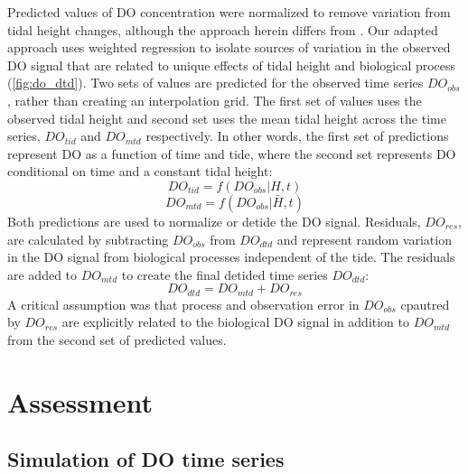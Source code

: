 \documentclass[letterpaper,12pt,oneside]{article}\usepackage[]{graphicx}\usepackage[]{color}
\begin{document}
Predicted values of \ac{DO} concentration were normalized to remove variation from tidal height changes, although the approach herein differs from \citet{Hirsch10}.  Our adapted approach uses weighted regression to isolate sources of variation in the observed \ac{DO} signal that are related to unique effects of tidal height and biological process (\cref{fig:do_dtd}).  Two sets of values are predicted for the observed time series $DO_{obs}$, rather than creating an interpolation grid.  The first set of values uses the observed tidal height and second set uses the mean tidal height across the time series, $DO_{tid}$ and $DO_{mtd}$ respectively.  In other words, the first set of predictions represent \ac{DO} as a function of time and tide, where the second set represents \ac{DO} conditional on time and a constant tidal height:
\begin{equation} \label{do_tid}
DO_{tid} = f(DO_{obs}|H, t)
\end{equation}
\begin{equation} \label{do_mtd}
DO_{mtd} = f(DO_{obs}|\bar{H}, t)
\end{equation}
Both predictions are used to normalize or detide the \ac{DO} signal.  Residuals, $DO_{res}$, are calculated by subtracting $DO_{obs}$ from $DO_{dtd}$ and represent random variation in the \ac{DO} signal from biological processes independent of the tide. The residuals are added to $DO_{mtd}$ to create the final detided time series $DO_{dtd}$:
\begin{equation} \label{do_dtd}
DO_{dtd} = DO_{mtd} + DO_{res}
\end{equation}
A critical assumption was that process and observation error in $DO_{obs}$ cpautred by $DO_{res}$ are explicitly related to the biological \ac{DO} signal in addition to $DO_{mtd}$ from the second set of predicted values. 

\section{Assessment}

\subsection{Simulation of \ac{DO} time series}
\end{document}
